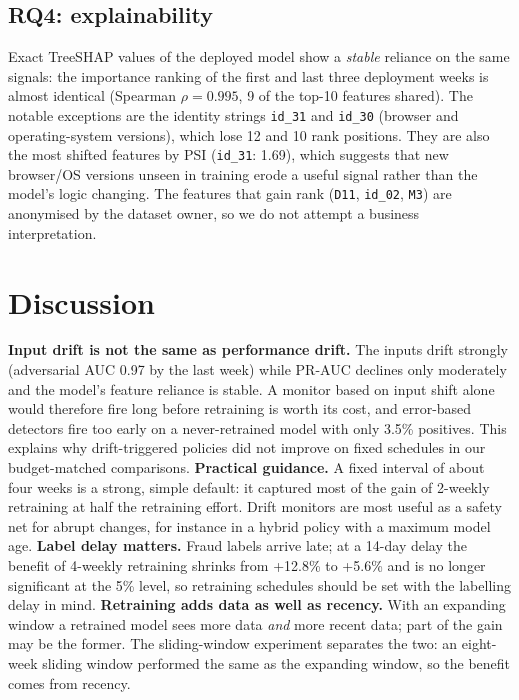 \documentclass[conference]{IEEEtran}
\begin{document}
\subsection{RQ4: explainability}
Exact TreeSHAP values of the deployed model show a \emph{stable} reliance on the same signals: the importance ranking of the first and
last three deployment weeks is almost identical (Spearman $\rho=0.995$, 9 of the top-10 features shared). The notable exceptions are the
identity strings \texttt{id\_31} and \texttt{id\_30} (browser and operating-system versions), which lose 12 and 10 rank positions. They are also
the most shifted features by PSI (\texttt{id\_31}: 1.69), which suggests that new browser/OS versions unseen in training erode
a useful signal rather than the model's logic changing. The features that gain rank (\texttt{D11}, \texttt{id\_02}, \texttt{M3}) are anonymised by the dataset owner, so we do not attempt a business interpretation.


\section{Discussion}
\textbf{Input drift is not the same as performance drift.} The inputs drift strongly (adversarial AUC 0.97 by the last week) while PR-AUC declines only moderately and the model's feature
reliance is stable. A monitor based on input shift alone would therefore fire long before retraining is worth its cost, and error-based detectors fire too early on a never-retrained
model with only 3.5\% positives. This explains why drift-triggered policies did not improve on fixed schedules in our budget-matched comparisons.
\textbf{Practical guidance.} A fixed interval of about four weeks is a strong, simple default: it captured most of the gain of 2-weekly retraining at half the retraining effort.
Drift monitors are most useful as a safety net for abrupt changes, for instance in a hybrid policy with a maximum model age.
\textbf{Label delay matters.} Fraud labels arrive late; at a 14-day delay the benefit of 4-weekly retraining shrinks from +12.8\% to +5.6\% and is no longer significant at the 5\% level, so retraining schedules should be set with the labelling delay in mind.
\textbf{Retraining adds data as well as recency.} With an expanding window a retrained model sees more data \emph{and} more recent data; part of the gain may be the former.
The sliding-window experiment separates the two: an eight-week sliding window performed the same as the expanding window, so the benefit comes from recency.
\end{document}
